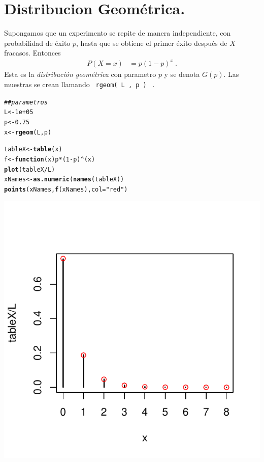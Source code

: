 \documentclass[12pt,reqno]{amsart}\usepackage[]{graphicx}\usepackage[]{color}
\makeatletter
\newcommand{\hlnum}[1]{\textcolor[rgb]{0.686,0.059,0.569}{#1}}%
\newcommand{\hlstr}[1]{\textcolor[rgb]{0.192,0.494,0.8}{#1}}%
\newcommand{\hlcom}[1]{\textcolor[rgb]{0.678,0.584,0.686}{\textit{#1}}}%
\newcommand{\hlopt}[1]{\textcolor[rgb]{0,0,0}{#1}}%
\newcommand{\hlstd}[1]{\textcolor[rgb]{0.345,0.345,0.345}{#1}}%
\newcommand{\hlkwa}[1]{\textcolor[rgb]{0.161,0.373,0.58}{\textbf{#1}}}%
\newcommand{\hlkwb}[1]{\textcolor[rgb]{0.69,0.353,0.396}{#1}}%
\newcommand{\hlkwc}[1]{\textcolor[rgb]{0.333,0.667,0.333}{#1}}%
\newcommand{\hlkwd}[1]{\textcolor[rgb]{0.737,0.353,0.396}{\textbf{#1}}}%
\newenvironment{kframe}{%
 \def\at@end@of@kframe{}%
 \ifinner\ifhmode%
  \def\at@end@of@kframe{\end{minipage}}%
  \begin{minipage}{\columnwidth}%
 \fi\fi%
 \def\FrameCommand##1{\hskip\@totalleftmargin \hskip-\fboxsep
 \colorbox{shadecolor}{##1}\hskip-\fboxsep
     \hskip-\linewidth \hskip-\@totalleftmargin \hskip\columnwidth}%
 \MakeFramed {\advance\hsize-\width
   \@totalleftmargin\z@ \linewidth\hsize
   \@setminipage}}%
 {\par\unskip\endMakeFramed%
 \at@end@of@kframe}
\newenvironment{knitrout}{}{} %
\makeatother
\begin{document}
\section{Distribucion Geométrica.}
Supongamos que un experimento se repite de manera independiente, con probabilidad de éxito $p$, hasta que se obtiene el primer éxito después de $X$ fracasos. Entonces
\begin{equation}\label{dbinomial}
  \begin{split}
    P(X=x) &= p (1-p)^x\:.
  \end{split}
\end{equation}
Esta es la \emph{distribución geométrica} con parametro $p$ y se denota $G(p)$. Las muestras se crean llamando \verb+ rgeom( L , p ) + .

\begin{knitrout}
\color{fgcolor}\begin{kframe}
\begin{alltt}
\hlcom{## parametros}
\hlstd{L} \hlkwb{<-} \hlnum{1e+05}
\hlstd{p} \hlkwb{<-} \hlnum{0.75}
\hlstd{x} \hlkwb{<-} \hlkwd{rgeom}\hlstd{(L, p)}
\end{alltt}
\end{kframe}
\end{knitrout}

\begin{knitrout}
\color{fgcolor}\begin{kframe}
\begin{alltt}
\hlstd{tableX} \hlkwb{<-} \hlkwd{table}\hlstd{(x)}
\hlstd{f} \hlkwb{<-} \hlkwa{function}\hlstd{(}\hlkwc{x}\hlstd{) p}\hlopt{*}\hlstd{(}\hlnum{1}\hlopt{-}\hlstd{p)}\hlopt{^}\hlstd{(x)}
\hlkwd{plot}\hlstd{(tableX}\hlopt{/}\hlstd{L)}
\hlstd{xNames} \hlkwb{<-} \hlkwd{as.numeric}\hlstd{(}\hlkwd{names}\hlstd{(tableX))}
\hlkwd{points}\hlstd{( xNames ,} \hlkwd{f}\hlstd{(xNames) ,} \hlkwc{col} \hlstd{=} \hlstr{"red"}\hlstd{)}
\end{alltt}
\end{kframe}
\includegraphics[width=.60\linewidth]{figure/histGeometrica_} 

\end{knitrout}
\end{document}
